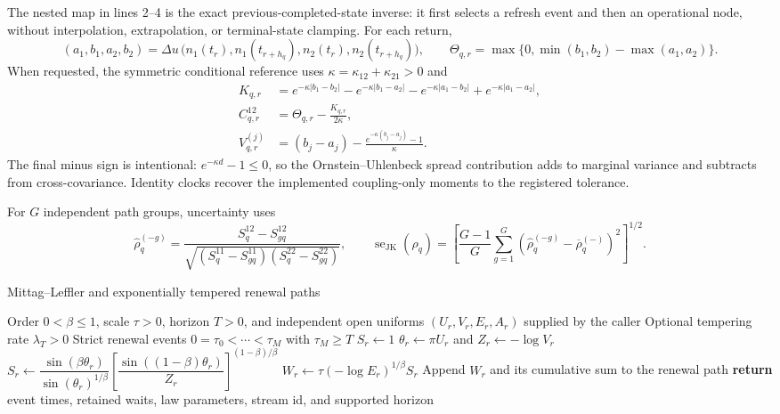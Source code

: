 The nested map in lines 2--4 is the exact previous-completed-state inverse: it
first selects a refresh event and then an operational node, without
interpolation, extrapolation, or terminal-state clamping.  For each return,
\begin{equation}
(a_1,b_1,a_2,b_2)=\Delta u\,
\bigl(n_1(t_r),n_1(t_{r+h_q}),n_2(t_r),n_2(t_{r+h_q})\bigr),
\qquad
\Theta_{q,r}=\max\{0,\min(b_1,b_2)-\max(a_1,a_2)\}.
\end{equation}
When requested, the symmetric conditional reference uses
$\kappa=\kappa_{12}+\kappa_{21}>0$ and
\begin{align}
K_{q,r}&=e^{-\kappa|b_1-b_2|}-e^{-\kappa|b_1-a_2|}
-e^{-\kappa|a_1-b_2|}+e^{-\kappa|a_1-a_2|},\\
C_{q,r}^{12}&=\Theta_{q,r}-\frac{K_{q,r}}{2\kappa},
\label{eq:algorithm-conditional-cross}\\
V_{q,r}^{(j)}&=(b_j-a_j)
-\frac{e^{-\kappa(b_j-a_j)}-1}{\kappa}.
\label{eq:algorithm-conditional-variance}
\end{align}
The final minus sign is intentional: $e^{-\kappa d}-1\leq0$, so the
Ornstein--Uhlenbeck spread contribution adds to marginal variance and subtracts
from cross-covariance.  Identity clocks recover the implemented coupling-only
moments to the registered tolerance.

For $G$ independent path groups, uncertainty uses
\begin{equation}
\widehat\rho_q^{(-g)}=
\frac{S_q^{12}-S_{gq}^{12}}
{\sqrt{(S_q^{11}-S_{gq}^{11})(S_q^{22}-S_{gq}^{22})}},
\qquad
\operatorname{se}_{\mathrm{JK}}(\widehat\rho_q)=
\left[\frac{G-1}{G}\sum_{g=1}^{G}
\left(\widehat\rho_q^{(-g)}-\overline\rho_q^{(-)}\right)^2\right]^{1/2}.
\end{equation}

\begin{algorithm}[H]
\caption{Mittag--Leffler and exponentially tempered renewal paths}
\label{alg:renewal-clock-construction}
\begin{algorithmic}[1]
\Require Order $0<\beta\leq1$, scale $\tau>0$, horizon $T>0$, and independent
open uniforms $(U_r,V_r,E_r,A_r)$ supplied by the caller
\Require Optional tempering rate $\lambda_T>0$
\Ensure Strict renewal events $0=\tau_0<\cdots<\tau_M$ with $\tau_M\geq T$
    \State $S_r\gets1$
  \Else
    \State $\theta_r\gets\pi U_r$ and $Z_r\gets-\log V_r$
    \State $S_r\gets
    \dfrac{\sin(\beta\theta_r)}{\sin(\theta_r)^{1/\beta}}
    \left[\dfrac{\sin((1-\beta)\theta_r)}{Z_r}\right]^{(1-\beta)/\beta}$
  \EndIf
  \State $W_r\gets\tau(-\log E_r)^{1/\beta}S_r$
    \State Append $W_r$ and its cumulative sum to the renewal path
  \EndIf
\EndFor
\State \textbf{return} event times, retained waits, law parameters, stream id,
and supported horizon
\end{algorithmic}
\end{algorithm}

